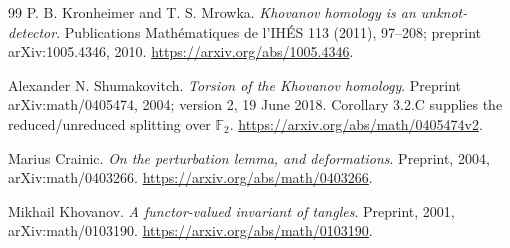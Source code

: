 \begin{thebibliography}{99}
P. B. Kronheimer and T. S. Mrowka.
\emph{Khovanov homology is an unknot-detector}.
Publications Math\'ematiques de l'IH\'ES 113 (2011), 97--208;
preprint arXiv:1005.4346, 2010.
\url{https://arxiv.org/abs/1005.4346}.

Alexander N. Shumakovitch.
\emph{Torsion of the Khovanov homology}.
Preprint arXiv:math/0405474, 2004; version 2, 19 June 2018.
Corollary 3.2.C supplies the reduced/unreduced splitting over
$\mathbb F_2$.
\url{https://arxiv.org/abs/math/0405474v2}.

Marius Crainic.
\emph{On the perturbation lemma, and deformations}.
Preprint, 2004, arXiv:math/0403266.
\url{https://arxiv.org/abs/math/0403266}.

Mikhail Khovanov.
\emph{A functor-valued invariant of tangles}.
Preprint, 2001, arXiv:math/0103190.
\url{https://arxiv.org/abs/math/0103190}.
\end{thebibliography}
